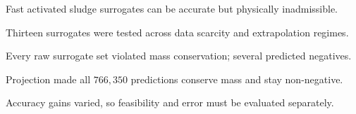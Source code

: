 \documentclass[a4paper,fleqn]{cas-sc}
\title[mode=title]{}
\author{}
\begin{document}
\begin{highlights}
\item Fast activated sludge surrogates can be accurate but physically inadmissible.
\item Thirteen surrogates were tested across data scarcity and extrapolation regimes.
\item Every raw surrogate set violated mass conservation; several predicted negatives.
\item Projection made all $766{,}350$ predictions conserve mass and stay non-negative.
\item Accuracy gains varied, so feasibility and error must be evaluated separately.
\end{highlights}

\thispagestyle{empty}
\unvbox\casauhlbox
\end{document}
